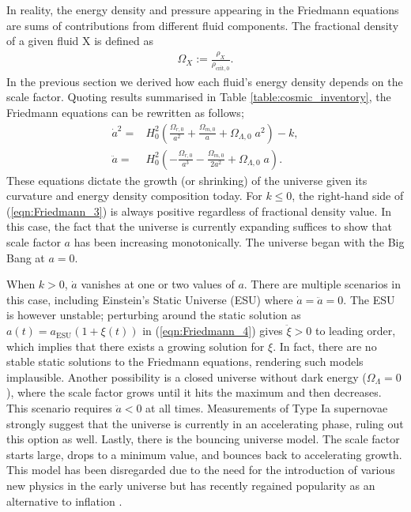 In reality, the energy density and pressure appearing in the Friedmann equations are sums of contributions from different fluid components. The fractional density of a given fluid X is defined as
\begin{align}
	\Omega_X := \frac{\rho_X}{\rho_{\text{crit},0}}.
\end{align}
In the previous section we derived how each fluid's energy density depends on the scale factor. Quoting results summarised in Table \ref{table:cosmic_inventory}, the Friedmann equations can be rewritten as follows;
\begin{align}
	\dot{a}^2 =& H_0^2 \left( \frac{\Omega_{r,0}}{a^2} + \frac{\Omega_{m,0}}{a} + \Omega_{\Lambda,0} \; a^2 \right) - k, \label{eqn:Friedmann_3}\\
	\ddot{a} =& H_0^2 \left( - \frac{\Omega_{r,0}}{a^3} - \frac{\Omega_{m,0}}{2a^2} + \Omega_{\Lambda,0} \; a \right). \label{eqn:Friedmann_4}
\end{align}
These equations dictate the growth (or shrinking) of the universe given its curvature and energy density composition today. For $k \le 0$, the right-hand side of (\ref{eqn:Friedmann_3}) is always positive regardless of fractional density value. In this case, the fact that the universe is currently expanding suffices to show that scale factor $a$ has been increasing monotonically. The universe began with the Big Bang at $a=0$.

When $k > 0$, $\dot{a}$ vanishes at one or two values of $a$. There are multiple scenarios in this case, including Einstein's Static Universe (ESU) where $\dot{a} = \ddot{a} = 0$. The ESU is however unstable; perturbing around the static solution as $a(t)=a_{\text{ESU}}(1+\xi(t))$ in (\ref{eqn:Friedmann_4}) gives $\ddot{\xi}>0$ to leading order, which implies that there exists a growing solution for $\xi$. In fact, there are no stable static solutions to the Friedmann equations, rendering such models implausible. Another possibility is a closed universe without dark energy ($\Omega_\Lambda = 0$), where the scale factor grows until it hits the maximum and then decreases. This scenario requires $\ddot{a}<0$ at all times. Measurements of Type Ia supernovae strongly suggest that the universe is currently in an accelerating phase, ruling out this option as well. Lastly, there is the bouncing universe model. The scale factor starts large, drops to a minimum value, and bounces back to accelerating growth. This model has been disregarded due to the need for the introduction of various new physics in the early universe but has recently regained popularity as an alternative to inflation \cite{Brandenberger2017bouncingcosmo}.

